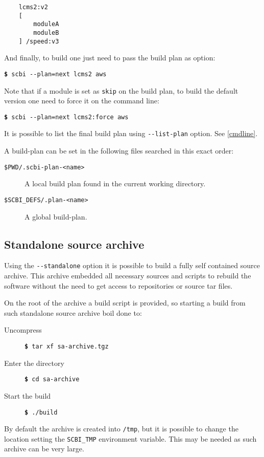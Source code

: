 \documentclass[a4paper,12pt,twoside]{article}
\newcommand{\code}[1]{\texttt{#1}}
\newcommand{\cmd}[1]{\tabto{1cm}\hspace{0.5cm}\texttt{\textbf{\$} #1}}
\newcommand{\ddash}{-{}-}
\begin{document}
\begin{lstlisting}
	lcms2:v2
	[
		moduleA
		moduleB
	] /speed:v3
\end{lstlisting}

And finally, to build one just need to pass the build plan as option:

\cmd{scbi \ddash{}plan=next lcms2 aws}

Note that if a module is set as \code{skip} on the build plan, to build the default version one need to force it on the command line:

\cmd{scbi \ddash{}plan=next lcms2:force aws}

It is possible to list the final build plan using \code{\ddash{}list-plan} option. See \ref{cmdline}.

A build-plan can be set in the following files searched in this exact order:

\begin{description}
	\item[\code{\$PWD/.scbi-plan-<name>}] A local build plan found in the current working directory.

	\item[\code{\$SCBI\_DEFS/.plan-<name>}] A global build-plan.
\end{description}

\subsection{Standalone source archive}
\label{standalone}

Using the \code{\ddash{}standalone} option it is possible to build a fully self contained source archive. This archive embedded all necessary sources and scripts to rebuild the software without the need to get access to repositories or source tar files.

On the root of the archive a build script is provided, so starting a build from such standalone source archive boil done to:

\begin{description}
	\item[Uncompress] \cmd{tar xf sa-archive.tgz}
	\item[Enter the directory] \cmd{cd sa-archive}
	\item[Start the build] \cmd{./build}
\end{description}

By default the archive is created into \code{/tmp}, but it is possible to change the location setting the \code{SCBI\_TMP} environment variable. This may be needed as such archive can be very large.
\end{document}
